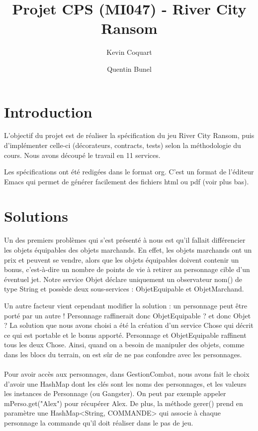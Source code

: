 \documentclass[a4paper,titlepage,openany,12pt]{report}
\title{Projet CPS (MI047) - River City Ransom}
\author{Kevin Coquart \and Quentin Bunel}
\begin{document}
\maketitle

\section*{Introduction}

L'objectif du projet est de réaliser la spécification du jeu River City Ransom,
puis d'implémenter celle-ci (décorateurs, contracts, tests) selon la méthodologie du cours.
Nous avons découpé le travail en 11 services.

Les spécifications ont été redigées dans le format org. C'est un format de l'éditeur Emacs
qui permet de générer facilement des fichiers html ou pdf (voir plus bas).

\section*{Solutions}

\paragraph{}
Un des premiers problèmes qui s'est présenté à nous est qu'il fallait différencier les objets équipables
des objets marchands. En effet, les objets marchands ont un prix et peuvent se vendre, alors que les objets 
équipables doivent contenir un bonus, c'est-à-dire un nombre de points de vie à retirer au personnage cible 
d'un éventuel jet. Notre service Objet déclare uniquement un observateur nom() de type String et possède deux 
sous-services : ObjetEquipable et ObjetMarchand.

Un autre facteur vient cependant modifier la solution : un personnage peut être porté par un autre !
Personnage raffinerait donc ObjetEquipable ? et donc Objet ?
La solution que nous avons choisi a été la création d'un service Chose qui décrit ce qui est portable et 
le bonus apporté. Personnage et ObjetEquipable raffinent tous les deux Chose.
Ainsi, quand on a besoin de manipuler des objets, comme dans les blocs du terrain, on est sûr de ne pas
confondre avec les personnages.

\paragraph{}
Pour avoir accès aux personnages, dans GestionCombat, nous avons fait le choix d'avoir une HashMap dont les
clés sont les noms des personnages, et les valeurs les instances de Personnage (ou Gangster). On peut par 
exemple appeler mPerso.get("Alex") pour récupérer Alex.
De plus, la méthode gerer() prend en paramètre une HashMap<String, COMMANDE> qui associe à chaque personnage
la commande qu'il doit réaliser dans le pas de jeu.
\end{document}
